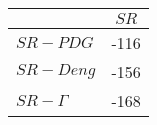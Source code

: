 \begin{tabular}{l|c}
\toprule
{} &  $SR$ \\
\midrule
\textbf{$SR-PDG$   } &  -116 \\
\textbf{$SR-Deng$  } &  -156 \\
\textbf{$SR-\Gamma$} &  -168 \\
\bottomrule
\end{tabular}
